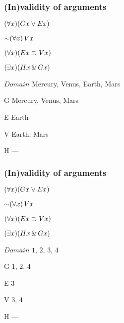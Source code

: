 \begin{frame}
  \frametitle{(In)validity of arguments}

\begin{earg}
\item[] $(\forall x)( Gx \vee  Ex)$
\item[] $\enot \qt{\forall}{x}\, V\qv{x}$
\item[] $(\forall x) (Ex \supset Vx)$
\item[\therefore] $(\exists x) (Hx \,\&\, Gx)$
\end{earg}

\begin{ekey}
\item[$Domain$] Mercury, Venus, Earth, Mars
\item[G\qv{x}] Mercury, Venus, Mars
\item[E\qv{x}] Earth
\item[V\qv{x}] Earth, Mars
\item[H\qv{x}] ---
\end{ekey}
\end{frame}

\begin{frame}
\frametitle{(In)validity of arguments}

\begin{earg}
\item[] $(\forall x)( Gx \vee  Ex)$
\item[] $\enot \qt{\forall}{x}\, V\qv{x}$
\item[] $(\forall x) (Ex \supset Vx)$
\item[\therefore] $(\exists x) (Hx \,\&\, Gx)$
\end{earg}

\begin{ekey}
\item[$Domain$] $1$, $2$, $3$, $4$
\item[G\qv{x}] $1$, $2$, $4$
\item[E\qv{x}] $3$
\item[V\qv{x}] $3$, $4$
\item[H\qv{x}] ---
\end{ekey}
\end{frame}

